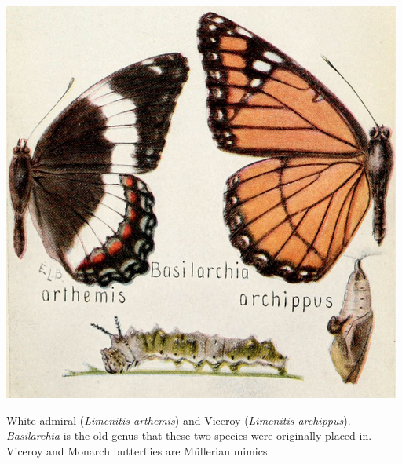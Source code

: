 \begin{marginfigure}
\begin{center}
\includegraphics[width=\textwidth]{illustration_images/Genetic_drift/Basilarchia_arthemis_archippus/Basilarchia_arthemis_archippus.png}
\end{center}
\caption{White admiral ({\it Limenitis arthemis}) and Viceroy ({\it Limenitis archippus}).  {\it Basilarchia} is the old genus that these two species were originally placed in. Viceroy and Monarch butterflies are M\"ullerian mimics. } \label{fig:Limenitis}
\end{marginfigure}

